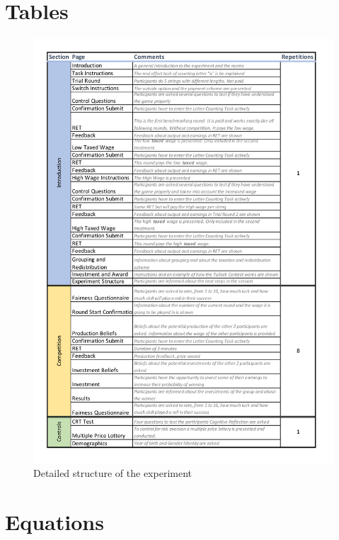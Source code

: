 \thispagestyle{fancy}

\begin{appendices}

\chapter{Tables}

    \begin{figure}
        \centering
        \includegraphics[width=\textwidth]{graphs/Experimental_Design.pdf}
        \caption{Detailed structure of the experiment}
        \label{tab:exp_design}
    \end{figure}

\chapter{Equations}


\end{appendices}
